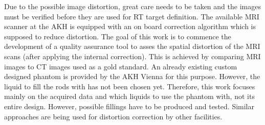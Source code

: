 Due to the possible image distortion, great care needs to be taken and the images must be verified before they are used for RT target definition.
The available MRI scanner at the AKH is equipped with an on board correction algorithm which is supposed to reduce distortion.
The goal of this work is to commence the development of a quality assurance tool to asses the spatial distortion of the MRI scans (after applying the internal correction).
This is achieved by comparing MRI images to CT images used as a gold standard.
An already existing custom designed phantom is provided by the AKH Vienna for this purpose.
However, the liquid to fill the rods with has not been chosen yet.
Therefore, this work focuses mainly on the acquired data and which liquids to use the phantom with, not its entire design.
However, possible fillings have to be produced and tested.
Similar approaches are being used for distortion correction by other facilities. \cite{Price2015, Petersch2004, Torfeh2015, Wang2004, Wang2004b, Mizowaki2000}

